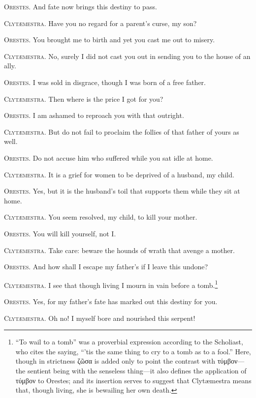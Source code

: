 \documentclass[12pt]{article}
\begin{document}
\textsc{Orestes.} And fate now brings this destiny to pass.

\textsc{Clyt{\ae}mestra.} Have you no regard for a parent's curse, my son?

\textsc{Orestes.} You brought me to birth and yet you cast me out to misery.

\textsc{Clyt{\ae}mestra.} No, surely I did not cast you out in sending you to the house of an ally.

\textsc{Orestes.} I was sold in disgrace, though I was born of a free father.

\textsc{Clyt{\ae}mestra.} Then where is the price I got for you?

\textsc{Orestes.} I am ashamed to reproach you with that outright.

\textsc{Clyt{\ae}mestra.} But do not fail to proclaim the follies of that father of yours as well.

\textsc{Orestes.} Do not accuse him who suffered while you sat idle at home.

\textsc{Clyt{\ae}mestra.} It is a grief for women to be deprived of a husband, my child.

\textsc{Orestes.} Yes, but it is the husband's toil that supports them while they sit at home.

\textsc{Clyt{\ae}mestra.} You seem resolved, my child, to kill your mother.

\textsc{Orestes.} You will kill yourself, not I.

\textsc{Clyt{\ae}mestra.} Take care: beware the hounds of wrath that avenge a mother.

\textsc{Orestes.} And how shall I escape my father's if I leave this undone?

\textsc{Clyt{\ae}mestra.} I see that though living I mourn in vain before a tomb.\footnote{\-``To wail to a tomb'' was a proverbial expression according to the Scholiast, who cites the saying, ``'tis the same thing to cry to a tomb as to a fool.'' Here, though in strictness ζῶσα is added only to point the contrast with τύμβον---the sentient being with the senseless thing---it also defines the application of τύμβον to Orestes; and its insertion serves to suggest that Clyt{\ae}mestra means that, though living, she is bewailing her own death.}

\textsc{Orestes.} Yes, for my father's fate has marked out this destiny for you.

\textsc{Clyt{\ae}mestra.} Oh no! I myself bore and nourished this serpent!
\end{document}
